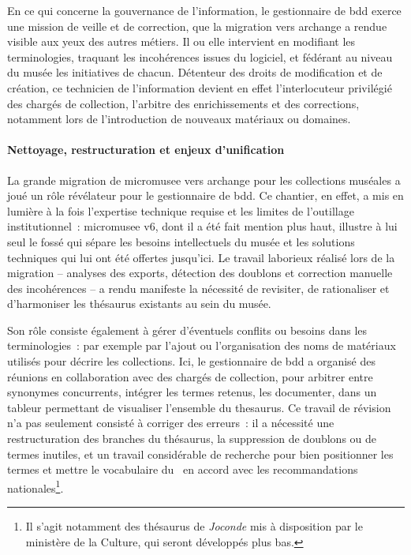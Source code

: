 En ce qui concerne la gouvernance de l'information, le gestionnaire de \gls{bdd} exerce une mission de veille et de correction, que la migration vers \gls{archange} a rendue visible aux yeux des autres métiers. Il ou elle intervient en modifiant les terminologies, traquant les incohérences issues du logiciel, et fédérant au niveau du musée les initiatives de chacun. Détenteur des droits de modification et de création, ce technicien de l’information devient en effet l’interlocuteur privilégié des chargés de collection, l'arbitre des enrichissements et des corrections, notamment lors de l’introduction de nouveaux matériaux ou domaines.



\paragraph*{Nettoyage, restructuration et enjeux d’unification}

La grande migration de \gls{micromusee} vers \gls{archange} pour les collections muséales a joué un rôle révélateur pour le gestionnaire de \gls{bdd}. Ce chantier, en effet, a mis en lumière à la fois l’expertise technique requise et les limites de l’outillage institutionnel~: \gls{micromusee} v6, dont il a été fait mention plus haut, illustre à lui seul le fossé qui sépare les besoins intellectuels du musée et les solutions techniques qui lui ont été offertes jusqu'ici. Le travail laborieux réalisé lors de la migration -- analyses des exports, détection des doublons et correction manuelle des incohérences -- a rendu manifeste la nécessité de revisiter, de rationaliser et d'harmoniser les thésaurus existants au sein du musée.



Son rôle consiste également à gérer d'éventuels conflits ou besoins dans les terminologies~: par exemple par l'ajout ou l'organisation des noms de matériaux utilisés pour décrire les collections. Ici, le gestionnaire de \gls{bdd} a organisé des réunions en collaboration avec des chargés de collection, pour arbitrer entre synonymes concurrents, intégrer les termes retenus, les documenter, dans un tableur permettant de visualiser l'ensemble du \gls{thesaurus}. Ce travail de révision n’a pas seulement consisté à corriger des erreurs~: il a nécessité une restructuration des branches du thésaurus, la suppression de doublons ou de termes inutiles, et un travail considérable de recherche pour bien positionner les termes et mettre le vocabulaire du \mae~en accord avec les recommandations nationales\footnote{Il s'agit notamment des thésaurus de \textit{Joconde} mis à disposition par le ministère de la Culture, qui seront développés plus bas.}.



